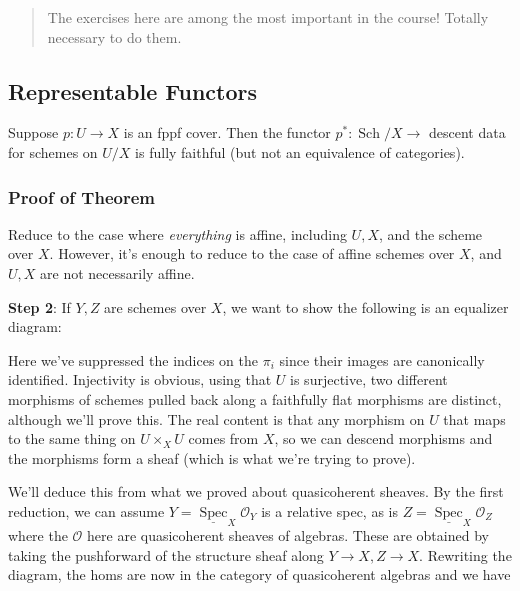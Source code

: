 \begin{quote}
The exercises here are among the most important in the course! Totally
necessary to do them.
\end{quote}

\hypertarget{representable-functors}{%
\subsection{Representable Functors}\label{representable-functors}}

\begin{theorem}[?]

Suppose \(p:U\to X\) is an fppf cover. Then the functor
\(p^*: {\operatorname{Sch}}/X \to\) descent data for schemes on \(U/X\)
is fully faithful (but not an equivalence of categories).

\end{theorem}

\hypertarget{proof-of-theorem-1}{%
\subsubsection{Proof of Theorem}\label{proof-of-theorem-1}}

\begin{exercise}[Step 1]

Reduce to the case where \emph{everything} is affine, including
\(U, X\), and the scheme over \(X\). However, it's enough to reduce to
the case of affine schemes over \(X\), and \(U, X\) are not necessarily
affine.

\end{exercise}

\textbf{Step 2}: If \(Y,Z\) are schemes over \(X\), we want to show the
following is an equalizer diagram:

Here we've suppressed the indices on the \(\pi_i\) since their images
are canonically identified. Injectivity is obvious, using that \(U\) is
surjective, two different morphisms of schemes pulled back along a
faithfully flat morphisms are distinct, although we'll prove this. The
real content is that any morphism on \(U\) that maps to the same thing
on \(U\times_X U\) comes from \(X\), so we can descend morphisms and the
morphisms form a sheaf (which is what we're trying to prove).

We'll deduce this from what we proved about quasicoherent sheaves. By
the first reduction, we can assume
\(Y = \underline{\operatorname{Spec}}_X {\mathcal{O}}_Y\) is a relative
spec, as is \(Z = \underline{\operatorname{Spec}}_X {\mathcal{O}}_Z\)
where the \({\mathcal{O}}\) here are quasicoherent sheaves of algebras.
These are obtained by taking the pushforward of the structure sheaf
along \(Y\to X, Z\to X\). Rewriting the diagram, the homs are now in the
category of quasicoherent algebras and we have

